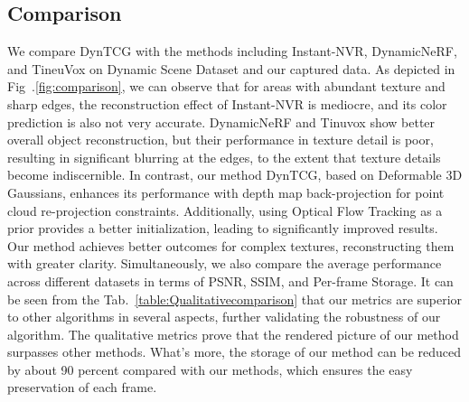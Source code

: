 \subsection{Comparison}
We compare DynTCG with the methods including Instant-NVR\cite{jiang2023instantnvr}, DynamicNeRF\cite{gao2021dynamic}, and TineuVox\cite{Fang_2022} on Dynamic Scene Dataset and our captured data. As depicted in Fig~.\ref{fig:comparison}, we can observe that for areas with abundant texture and sharp edges, the reconstruction effect of Instant-NVR is mediocre, and its color prediction is also not very accurate. DynamicNeRF and Tinuvox show better overall object reconstruction, but their performance in texture detail is poor, resulting in significant blurring at the edges, to the extent that texture details become indiscernible. In contrast, our method DynTCG, based on Deformable 3D Gaussians, enhances its performance with depth map back-projection for point cloud re-projection constraints. Additionally, using Optical Flow Tracking as a prior provides a better initialization, leading to significantly improved results. Our method achieves better outcomes for complex textures, reconstructing them with greater clarity. Simultaneously, we also compare the average performance across different datasets in terms of PSNR, SSIM, and Per-frame Storage. It can be seen from the Tab.~\ref{table:Qualitativecomparison} that our metrics are superior to other algorithms in several aspects, further validating the robustness of our algorithm. The qualitative metrics prove that the rendered picture of our method surpasses other methods. What's more, the storage of our method can be reduced by about 90 percent compared with our methods, which ensures the easy preservation of each frame.
